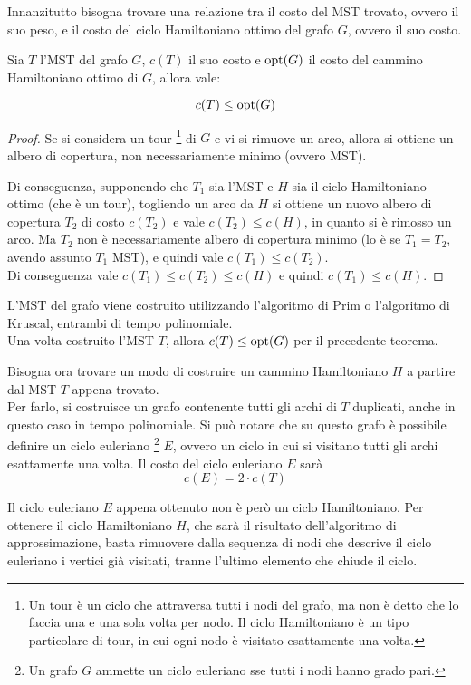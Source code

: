 Innanzitutto bisogna trovare una relazione tra il costo del MST trovato, ovvero il suo peso, e il costo del ciclo Hamiltoniano ottimo del grafo $G$, ovvero il suo costo.
\begin{thm}
    Sia $T$ l'MST del grafo $G$, $c(T)$ il suo costo e $\textnormal{opt}(G)$ il costo del cammino Hamiltoniano ottimo di $G$, allora vale:
\end{thm}
\[
    c(T) \le \textnormal{opt}(G)
\]
\begin{proof}
    Se si considera un tour \footnote{Un tour è un ciclo che attraversa tutti i nodi del grafo, ma non è detto che lo faccia una e una sola volta per nodo. Il ciclo Hamiltoniano è un tipo particolare di tour, in cui ogni nodo è visitato esattamente una volta.} di $G$ e vi si rimuove un arco, allora si ottiene un albero di copertura, non necessariamente minimo (ovvero MST).

    Di conseguenza, supponendo che $T_1$ sia l'MST e $H$ sia il ciclo Hamiltoniano ottimo (che è un tour), togliendo un arco da $H$ si ottiene un nuovo albero di copertura $T_2$ di costo $c(T_2)$ e vale $c(T_2) \le c(H)$, in quanto si è rimosso un arco. Ma $T_2$ non è necessariamente albero di copertura minimo (lo è se $T_1 = T_2$, avendo assunto $T_1$ MST), e quindi vale $c(T_1) \le c(T_2)$.\\
    Di conseguenza vale $c(T_1) \le c(T_2) \le c(H)$ e quindi $c(T_1) \le c(H)$.
\end{proof}

L'MST del grafo viene costruito utilizzando l'algoritmo di Prim o l'algoritmo di Kruscal, entrambi di tempo polinomiale.\\
Una volta costruito l'MST $T$, allora $c(T) \le \textnormal{opt}(G)$ per il precedente teorema.

Bisogna ora trovare un modo di costruire un cammino Hamiltoniano $H$ a partire dal MST $T$ appena trovato.\\
Per farlo, si costruisce un grafo contenente tutti gli archi di $T$ duplicati, anche in questo caso in tempo polinomiale.
Si può notare che su questo grafo è possibile definire un ciclo euleriano \footnote{Un grafo $G$ ammette un ciclo euleriano sse tutti i nodi hanno grado pari.} $E$, ovvero un ciclo in cui si visitano tutti gli archi esattamente una volta. Il costo del ciclo euleriano $E$ sarà 
\[
    c(E) = 2 \cdot c(T)
\]

Il ciclo euleriano $E$ appena ottenuto non è però un ciclo Hamiltoniano. Per ottenere il ciclo Hamiltoniano $H$, che sarà il risultato dell'algoritmo di approssimazione, basta rimuovere dalla sequenza di nodi che descrive il ciclo euleriano i vertici già visitati, tranne l'ultimo elemento che chiude il ciclo.

